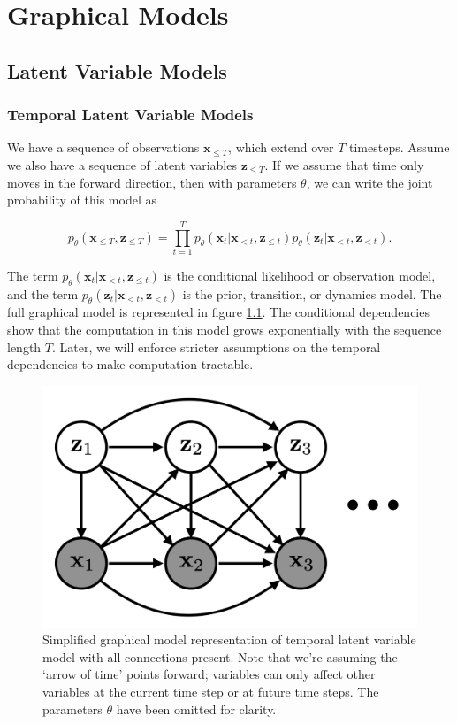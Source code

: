 \chapter{Graphical Models}

\section{Latent Variable Models}

\subsection{Temporal Latent Variable Models}

We have a sequence of observations $\mathbf{x}_{\leq T}$, which extend over $T$ timesteps. Assume we also have a sequence of latent variables $\mathbf{z}_{\leq T}$. If we assume that time only moves in the forward direction, then with parameters $\theta$, we can write the joint probability of this model as

\begin{equation}
	p_\theta (\mathbf{x}_{\leq T}, \mathbf{z}_{\leq T}) = \prod_{t=1}^T p_\theta (\mathbf{x}_{t} | \mathbf{x}_{< t}, \mathbf{z}_{\leq t}) p_\theta (\mathbf{z}_{t} | \mathbf{x}_{< t}, \mathbf{z}_{< t}).
\end{equation}

\noindent The term $p_\theta (\mathbf{x}_{t} | \mathbf{x}_{< t}, \mathbf{z}_{\leq t})$ is the conditional likelihood or observation model, and the term $p_\theta (\mathbf{z}_{t} | \mathbf{x}_{< t}, \mathbf{z}_{< t})$ is the prior, transition, or dynamics model. The full graphical model is represented in figure \ref{fig: full_temporal_model}. The conditional dependencies show that the computation in this model grows exponentially with the sequence length $T$. Later, we will enforce stricter assumptions on the temporal dependencies to make computation tractable.

\begin{figure}[h]
    \centering
    \includegraphics[width=.5\textwidth]{images/graphical_models/full_temporal_model.png}
    \caption{Simplified graphical model representation of temporal latent variable model with all connections present. Note that we're assuming the `arrow of time' points forward; variables can only affect other variables at the current time step or at future time steps. The parameters $\theta$ have been omitted for clarity.}
    \label{fig: full_temporal_model}
\end{figure}

